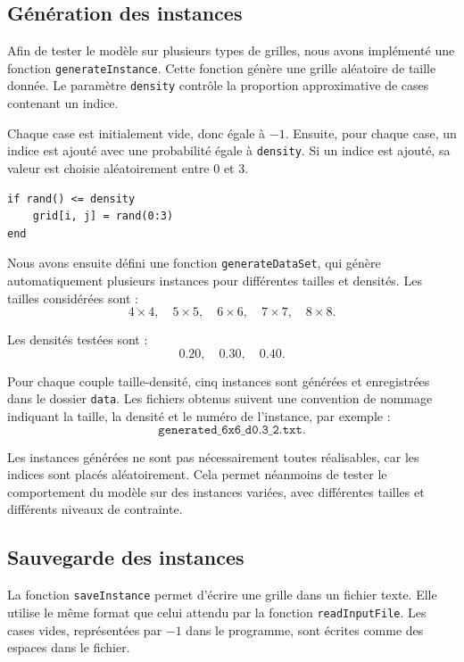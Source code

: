 \subsection{Génération des instances}

Afin de tester le modèle sur plusieurs types de grilles, nous avons implémenté une fonction \texttt{generateInstance}. Cette fonction génère une grille aléatoire de taille donnée. Le paramètre \texttt{density} contrôle la proportion approximative de cases contenant un indice.

Chaque case est initialement vide, donc égale à \(-1\). Ensuite, pour chaque case, un indice est ajouté avec une probabilité égale à \texttt{density}. Si un indice est ajouté, sa valeur est choisie aléatoirement entre \(0\) et \(3\).

\begin{verbatim}
if rand() <= density
    grid[i, j] = rand(0:3)
end
\end{verbatim}

Nous avons ensuite défini une fonction \texttt{generateDataSet}, qui génère automatiquement plusieurs instances pour différentes tailles et densités. Les tailles considérées sont :
\[
4 \times 4,\quad 5 \times 5,\quad 6 \times 6,\quad 7 \times 7,\quad 8 \times 8.
\]

Les densités testées sont :
\[
0.20,\quad 0.30,\quad 0.40.
\]

Pour chaque couple taille-densité, cinq instances sont générées et enregistrées dans le dossier \texttt{data}. Les fichiers obtenus suivent une convention de nommage indiquant la taille, la densité et le numéro de l'instance, par exemple :
\[
\texttt{generated\_6x6\_d0.3\_2.txt}.
\]

Les instances générées ne sont pas nécessairement toutes réalisables, car les indices sont placés aléatoirement. Cela permet néanmoins de tester le comportement du modèle sur des instances variées, avec différentes tailles et différents niveaux de contrainte.

\subsection{Sauvegarde des instances}

La fonction \texttt{saveInstance} permet d'écrire une grille dans un fichier texte. Elle utilise le même format que celui attendu par la fonction \texttt{readInputFile}. Les cases vides, représentées par \(-1\) dans le programme, sont écrites comme des espaces dans le fichier.

